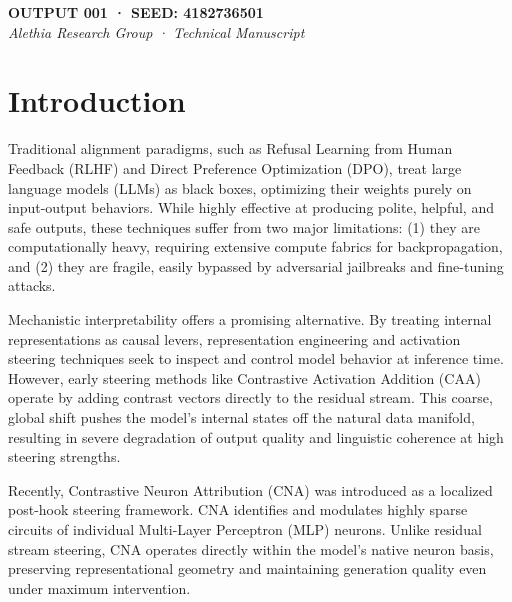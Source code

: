 \documentclass[11pt]{article}
\begin{document}
\vfill
\noindent\small{\textbf{OUTPUT 001 · SEED: 4182736501} \\
\textit{Alethia Research Group · Technical Manuscript}}

\newpage

\section{Introduction}

Traditional alignment paradigms, such as Refusal Learning from Human Feedback (RLHF) and Direct Preference Optimization (DPO), treat large language models (LLMs) as black boxes, optimizing their weights purely on input-output behaviors. While highly effective at producing polite, helpful, and safe outputs, these techniques suffer from two major limitations: (1) they are computationally heavy, requiring extensive compute fabrics for backpropagation, and (2) they are fragile, easily bypassed by adversarial jailbreaks and fine-tuning attacks.

Mechanistic interpretability offers a promising alternative. By treating internal representations as causal levers, representation engineering and activation steering techniques seek to inspect and control model behavior at inference time. However, early steering methods like Contrastive Activation Addition (CAA) \cite{zou2023representation, turner2023activation} operate by adding contrast vectors directly to the residual stream. This coarse, global shift pushes the model's internal states off the natural data manifold, resulting in severe degradation of output quality and linguistic coherence at high steering strengths.

Recently, Contrastive Neuron Attribution (CNA) was introduced as a localized post-hook steering framework. CNA identifies and modulates highly sparse circuits of individual Multi-Layer Perceptron (MLP) neurons. Unlike residual stream steering, CNA operates directly within the model's native neuron basis, preserving representational geometry and maintaining generation quality even under maximum intervention.
\end{document}
